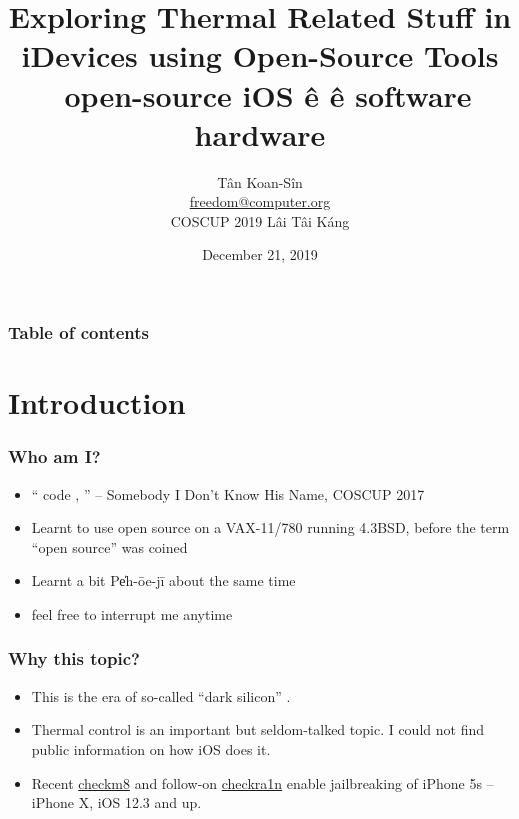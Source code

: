 \documentclass{beamer}
\begin{document}
\title{Exploring Thermal Related Stuff in iDevices using Open-Source Tools \\
  \ open-source     iOS ê      \^e software  hardware}

\author[freedom]{T\^an Koan-S\^in \\ \href{mailto:freedom@computer.org}{freedom@computer.org} \\ COSCUP 2019 Lâi Tâi Káng}
\date{December 21, 2019}

\begin{frame}
  \titlepage
\end{frame}

\begin{frame}
  \frametitle{Table of contents}
  \tableofcontents
\end{frame}

\section{Introduction}
\begin{frame}
  \frametitle{Who am I?}
  \begin{itemize}
  \item ``    code  ,    '' -- Somebody I Don't Know His Name, COSCUP 2017
  \item Learnt to use open source on a VAX-11/780 running 4.3BSD, before the term ``open source'' was coined
  \item Learnt a bit Pe̍h-ōe-jī about the same time
  \item feel free to interrupt me anytime
  \end{itemize}
\end{frame}

\begin{frame}
  \frametitle{Why this topic?}
  \begin{itemize}
  \item This is the era of so-called ``dark silicon'' \cite{Esmaeilzadeh:2011:DSE:2000064.2000108}.
  \item Thermal control is an important but seldom-talked topic. I could not find public information on how iOS does it.
  \item Recent \href{https://github.com/axi0mX/ipwndfu}{checkm8} \cite{checkm8} and follow-on \href{https://checkra.in/}{checkra1n} \cite{checkra1n} enable jailbreaking of iPhone 5s – iPhone X, iOS 12.3 and up.
  \end{itemize}
\end{frame}
\end{document}
